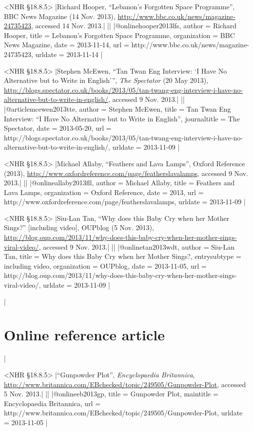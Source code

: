 \documentclass[extrafontsizes,11pt,a4paper,oneside]{memoir}
\begin{document}
\bibexample<NHR \S18.8.5>
|Richard Hooper, \enquote{Lebanon's Forgotten Space Programme}, BBC News Magazine (14 Nov. 2013), \url{http://www.bbc.co.uk/news/magazine-24735423}, accessed 14 Nov. 2013.|%
||%
|@online{hooper2013lfs,
  author = {Richard Hooper},
  title = {Lebanon's Forgotten Space Programme},
  organization = {BBC News Magazine},
  date = {2013-11-14},
  url = {http://www.bbc.co.uk/news/magazine-24735423},
  urldate = {2013-11-14}
}|

\bibexample<NHR \S18.8.5>
|Stephen McEwen, \enquote{Tan Twan Eng Interview: \enquote{I Have No Alternative but to Write in English}}, \emph{The Spectator} (20 May 2013), \url{http://blogs.spectator.co.uk/books/2013/05/tan-twang-eng-interview-i-have-no-alternative-but-to-write-in-english/}, accessed 9 Nov. 2013.|%
||%
|@article{mcewen2013tte,
  author = {Stephen McEwen},
  title = {Tan Twan Eng Interview: \enquote{I Have No Alternative but to Write in English}},
  journaltitle = {The Spectator},
  date = {2013-05-20},
  url = {http://blogs.spectator.co.uk/books/2013/05/tan-twang-eng-interview-i-have-no-alternative-but-to-write-in-english/},
  urldate = {2013-11-09}
}|

\bibexample<NHR \S18.8.5>
|Michael Allaby, \enquote{Feathers and Lava Lamps}, Oxford Reference (2013), \url{http://www.oxfordreference.com/page/featherslavalamps}, accessed 9 Nov. 2013.|%
||%
|@online{allaby2013fll,
  author = {Michael Allaby},
  title = {Feathers and Lava Lamps},
  organization = {Oxford Reference},
  date = {2013},
  url = {http://www.oxfordreference.com/page/featherslavalamps},
  urldate = {2013-11-09}
}|

\bibexample<NHR \S18.8.5>
|Siu-Lan Tan, \enquote{Why does this Baby Cry when her Mother Sings?} [including video], OUPblog (5 Nov. 2013), \url{http://blog.oup.com/2013/11/why-does-this-baby-cry-when-her-mother-sings-viral-video/}, accessed 9 Nov. 2013.|%
||%
|@online{tan2013wdt,
  author = {Siu-Lan Tan},
  title = {Why does this Baby Cry when her Mother Sings?},
  entrysubtype = {including video},
  organization = {OUPblog},
  date = {2013-11-05},
  url = {http://blog.oup.com/2013/11/why-does-this-baby-cry-when-her-mother-sings-viral-video/},
  urldate = {2013-11-09}
}|

\todoc|
\section{Online reference article}
|

\bibexample<NHR \S18.8.5>
|\enquote{Gunpowder Plot}, \emph{Encyclopaedia Britannica}, \url{http://www.britannica.com/EBchecked/topic/249505/Gunpowder-Plot}, accessed 5 Nov. 2013.|%
||%
|@online{eb2013gp,
  title = {Gunpowder Plot},
  maintitle = {Encyclopaedia Britannica},
  url = {http://www.britannica.com/EBchecked/topic/249505/Gunpowder-Plot},
  urldate = {2013-11-05}
}|
\end{document}
